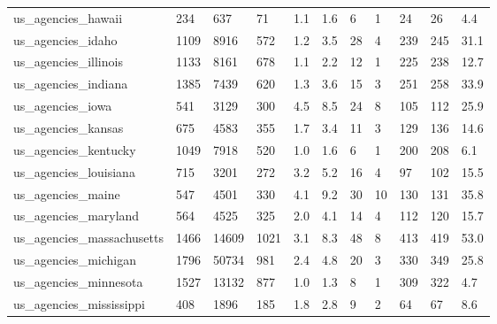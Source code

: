 \begin{longtable}{lllllllllll}
 us\_agencies\_hawaii                                 & 234        & 637       & 71    & 1.1    & 1.6    & 6     & 1      & 24     & 26     & 4.4     \\
 us\_agencies\_idaho                                  & 1109       & 8916      & 572   & 1.2    & 3.5    & 28    & 4      & 239    & 245    & 31.1    \\
 us\_agencies\_illinois                               & 1133       & 8161      & 678   & 1.1    & 2.2    & 12    & 1      & 225    & 238    & 12.7    \\
 us\_agencies\_indiana                                & 1385       & 7439      & 620   & 1.3    & 3.6    & 15    & 3      & 251    & 258    & 33.9    \\
 us\_agencies\_iowa                                   & 541        & 3129      & 300   & 4.5    & 8.5    & 24    & 8      & 105    & 112    & 25.9    \\
 us\_agencies\_kansas                                 & 675        & 4583      & 355   & 1.7    & 3.4    & 11    & 3      & 129    & 136    & 14.6    \\
 us\_agencies\_kentucky                               & 1049       & 7918      & 520   & 1.0    & 1.6    & 6     & 1      & 200    & 208    & 6.1     \\
 us\_agencies\_louisiana                              & 715        & 3201      & 272   & 3.2    & 5.2    & 16    & 4      & 97     & 102    & 15.5    \\
 us\_agencies\_maine                                  & 547        & 4501      & 330   & 4.1    & 9.2    & 30    & 10     & 130    & 131    & 35.8    \\
 us\_agencies\_maryland                               & 564        & 4525      & 325   & 2.0    & 4.1    & 14    & 4      & 112    & 120    & 15.7    \\
 us\_agencies\_massachusetts                          & 1466       & 14609     & 1021  & 3.1    & 8.3    & 48    & 8      & 413    & 419    & 53.0    \\
 us\_agencies\_michigan                               & 1796       & 50734     & 981   & 2.4    & 4.8    & 20    & 3      & 330    & 349    & 25.8    \\
 us\_agencies\_minnesota                              & 1527       & 13132     & 877   & 1.0    & 1.3    & 8     & 1      & 309    & 322    & 4.7     \\
 us\_agencies\_mississippi                            & 408        & 1896      & 185   & 1.8    & 2.8    & 9     & 2      & 64     & 67     & 8.6     \\

\end{longtable}
